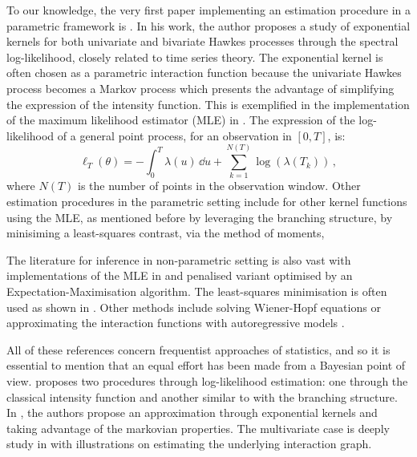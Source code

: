     To our knowledge, the very first paper implementing an estimation procedure in a parametric framework is \textcite{Adamopoulos1976}.
    In his work, the author proposes a study of exponential kernels for both univariate and bivariate Hawkes processes through the spectral log-likelihood,
    closely related to time series theory.
    The exponential kernel is often chosen as a parametric interaction function because the univariate Hawkes process becomes a Markov process which presents the advantage of simplifying the expression of the intensity function. 
    This is exemplified in the implementation of the maximum likelihood estimator (MLE) in \textcite{Ozaki1979}.
    The expression of the log-likelihood of a general point process, for an observation in $[0, T]$, is:
    \begin{equation}\label{eq:chap0_loglikelihood}
      \ell_T(\theta) = - \int_{0}^{T}{\lambda(u)\,\dd u} + \sum_{k=1}^{N(T)}{\log(\lambda(T_k))}\,,
    \end{equation}
    where $N(T)$ is the number of points in the observation window. 
    Other estimation procedures in the parametric setting include \textcite{Ogata1988} for other kernel functions using the MLE, \textcite{Veen2008} as mentioned before by leveraging the branching structure, \textcite{Bacry2020} by minisiming a least-squares contrast, \textcite{DaFonseca2013} via the method of moments,

    The literature for inference in non-parametric setting is also vast with implementations of the MLE in \textcite{Guo2018} and penalised variant optimised by an Expectation-Maximisation algorithm.
    The least-squares minimisation is often used as shown in \parencite{Reynaud2010, Eichler2016, Kirchner2017}.
    Other methods include solving Wiener-Hopf equations \parencite{Bacry2016} or approximating the interaction functions with autoregressive models \parencite{Kirchner2017}.

    All of these references concern frequentist approaches of statistics, 
    and so it is essential to mention that an equal effort has been made from a Bayesian point of view.
    \textcite{Rasmussen2013} proposes two procedures through log-likelihood estimation: 
    one through the classical intensity function and another similar to \textcite{Veen2008} with the branching structure.
    In \textcite{Lemonnier2014}, the authors propose an approximation through exponential kernels and taking advantage of the markovian properties.
    The multivariate case is deeply study in \textcite{Donnet2020} with illustrations on estimating the underlying interaction graph.
    
